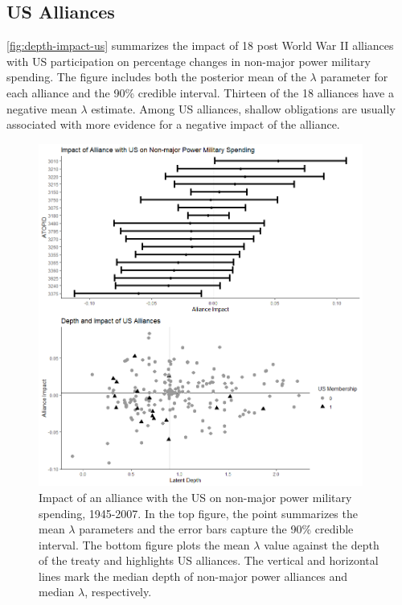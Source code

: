 \documentclass[12pt]{article}
\begin{document}
\subsection{US Alliances}


\autoref{fig:depth-impact-us} summarizes the impact of 18 post World War II alliances with US participation on percentage changes in non-major power military spending.
The figure includes both the posterior mean of the $\lambda$ parameter for each alliance and the 90\% credible interval. 
Thirteen of the 18 alliances have a negative mean $\lambda$ estimate. 
Among US alliances, shallow obligations are usually associated with more evidence for a negative impact of the alliance. 


\begin{figure}[htbp]
	\centering
		\includegraphics[width=0.95\textwidth]{../figures/depth-impact-us.png}
	\caption{Impact of an alliance with the US on non-major power military spending, 1945-2007. In the top figure, the point summarizes the mean $\lambda$ parameters and the error bars capture the 90\% credible interval. The bottom figure plots the mean $\lambda$ value against the depth of the treaty and highlights US alliances. The vertical and horizontal lines mark the median depth of non-major power alliances and median $\lambda$, respectively.}
	\label{fig:depth-impact-us}
\end{figure}
\end{document}
